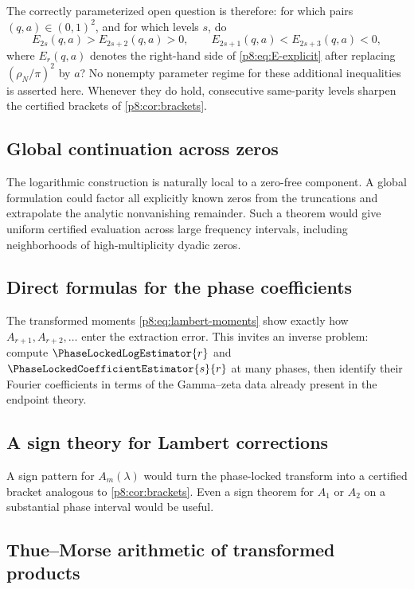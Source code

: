 \documentclass[11pt]{article}
\numberwithin{equation}{section}
\theoremstyle{definition}
\theoremstyle{remark}
\begin{document}
The correctly parameterized open question is therefore: for which pairs
$(q,a)\in(0,1)^2$, and for which levels $s$, do
\[
 E_{2s}(q,a)>E_{2s+2}(q,a)>0,
 \qquad
 E_{2s+1}(q,a)<E_{2s+3}(q,a)<0,
\]
where $E_r(q,a)$ denotes the right-hand side of \eqref{p8:eq:E-explicit} after replacing
$(\rho_N/\pi)^2$ by $a$?  No nonempty parameter regime for these additional inequalities
is asserted here.  Whenever they do hold, consecutive same-parity levels sharpen the
certified brackets of \cref{p8:cor:brackets}.

\subsection{Global continuation across zeros}

The logarithmic construction is naturally local to a zero-free component. A global formulation could factor all explicitly known zeros from the truncations and extrapolate the analytic nonvanishing remainder. Such a theorem would give uniform certified evaluation across large frequency intervals, including neighborhoods of high-multiplicity dyadic zeros.

\subsection{Direct formulas for the phase coefficients}

The transformed moments \cref{p8:eq:lambert-moments} show exactly how $A_{r+1},A_{r+2},\ldots$ enter the extraction error. This invites an inverse problem: compute $\PhaseLockedLogEstimator{r}$ and $\PhaseLockedCoefficientEstimator{s}{r}$ at many phases, then identify their Fourier coefficients in terms of the Gamma--zeta data already present in the endpoint theory.

\subsection{A sign theory for Lambert corrections}

A sign pattern for $A_m(\lambda)$ would turn the phase-locked transform into a certified bracket analogous to \cref{p8:cor:brackets}. Even a sign theorem for $A_1$ or $A_2$ on a substantial phase interval would be useful.

\subsection{Thue--Morse arithmetic of transformed products}
\end{document}
